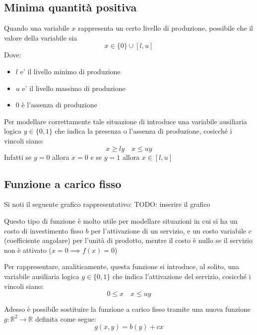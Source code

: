 \subsection{Minima quantità positiva}

Quando una variabile $x$ rappresenta un certo livello di produzione, possibile che il valore della variabile sia 
\[
  x  \in \{0\} \cup [l,u]
\] 
Dove:
\begin{itemize}
  \item $ l $ e' il livello minimo di produzione
  \item $ u $ e' il livello massimo di produzione
  \item 0 è l'assenza di produzione
\end{itemize}
Per modellare correttamente tale situazione di introduce una variabile ausiliaria logica $y\in \{0,1\}$ che indica la presenza o l'assenza di produzione, cosicché i vincoli siano:
\[
  x \geq ly \quad x \leq uy
\]
Infatti se $y=0$ allora $x=0$ e se $y=1$ allora $x\in [l,u]$

\subsection{Funzione a carico fisso}
Si noti il seguente grafico rappresentativo:
TODO: inserire il grafico

Questo tipo di funzione è molto utile per modellare situazioni in cui si ha un costo di investimento fisso $b$ per l'attivazione di un servizio, e un costo variabile $c$ (coefficiente angolare) per l'unità di prodotto, mentre il costo è nullo se il servizio non è attivato ($x= 0 \implies f(x) = 0$)

Per rappresentare, analiticamente, questa funzione si introduce, al solito, una variabile ausiliaria logica $y\in \{0,1\}$ che indica l'attivazione del servizio, cosicché i vincoli siano:
\[
  0\leq x \quad x \leq uy 
\]

Adesso è possibile sostituire la funzione a carico fisso tramite una nuova funzione $g:\mathbb{R}^2\to\mathbb{R}$ definita come segue:
\[
  g(x,y) = b(y) + cx
\]


